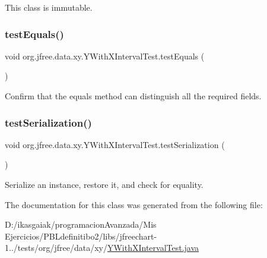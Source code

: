 This class is immutable. \mbox{\label{classorg_1_1jfree_1_1data_1_1xy_1_1_y_with_x_interval_test_ae7280fca6abc2afaffd3f5ba9893d469}} 
\subsubsection{\texorpdfstring{test\+Equals()}{testEquals()}}
{\footnotesize\ttfamily void org.\+jfree.\+data.\+xy.\+Y\+With\+X\+Interval\+Test.\+test\+Equals (\begin{DoxyParamCaption}{ }\end{DoxyParamCaption})}

Confirm that the equals method can distinguish all the required fields. \mbox{\label{classorg_1_1jfree_1_1data_1_1xy_1_1_y_with_x_interval_test_a9a3f2299d7e65ffb85f00ea7fb827230}} 
\subsubsection{\texorpdfstring{test\+Serialization()}{testSerialization()}}
{\footnotesize\ttfamily void org.\+jfree.\+data.\+xy.\+Y\+With\+X\+Interval\+Test.\+test\+Serialization (\begin{DoxyParamCaption}{ }\end{DoxyParamCaption})}

Serialize an instance, restore it, and check for equality. 

The documentation for this class was generated from the following file\+:\begin{DoxyCompactItemize}
\item 
D\+:/ikasgaiak/programacion\+Avanzada/\+Mis Ejercicios/\+P\+B\+Ldefinitibo2/libs/jfreechart-\/1../tests/org/jfree/data/xy/\mbox{\hyperlink{_y_with_x_interval_test_8java}{Y\+With\+X\+Interval\+Test.\+java}}\end{DoxyCompactItemize}
